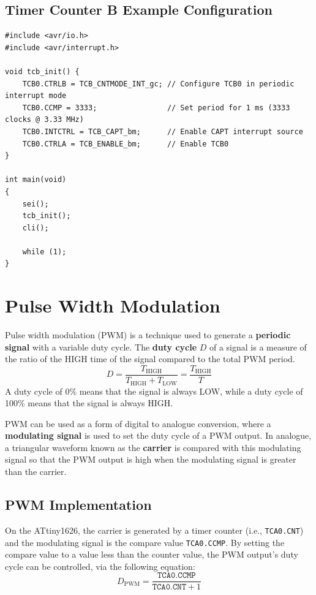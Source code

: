 \documentclass{report}
\begin{document}
\subsection{Timer Counter B Example Configuration}
\begin{verbatim}
#include <avr/io.h>
#include <avr/interrupt.h>

void tcb_init() {
    TCB0.CTRLB = TCB_CNTMODE_INT_gc; // Configure TCB0 in periodic interrupt mode
    TCB0.CCMP = 3333;                // Set period for 1 ms (3333 clocks @ 3.33 MHz)
    TCB0.INTCTRL = TCB_CAPT_bm;      // Enable CAPT interrupt source
    TCB0.CTRLA = TCB_ENABLE_bm;      // Enable TCB0
}

int main(void)
{
    sei();
    tcb_init();
    cli();

    while (1);
}
\end{verbatim}
\section{Pulse Width Modulation}
Pulse width modulation (PWM) is a technique used to generate a \textbf{periodic signal}
with a variable duty cycle. The \textbf{duty cycle} \(D\) of a signal
is a measure of the ratio of the HIGH time of the signal compared to the total PWM period.
\begin{equation*}
    D = \frac{T_\mathrm{HIGH}}{T_\mathrm{HIGH} + T_\mathrm{LOW}} = \frac{T_\mathrm{HIGH}}{T}
\end{equation*}
A duty cycle of 0\% means that the signal is always LOW, while a duty cycle of 100\%
means that the signal is always HIGH\@.

PWM can be used as a form of digital to analogue conversion, where a \textbf{modulating signal}
is used to set the duty cycle of a PWM output. In analogue, a triangular waveform known as the \textbf{carrier}
is compared with this modulating signal so that the PWM output is high when the modulating signal is greater than the carrier.
\subsection{PWM Implementation}
On the ATtiny1626, the carrier is generated by a timer counter (i.e., \texttt{TCA0.CNT}) and the modulating signal
is the compare value \texttt{TCA0.CCMP}. By setting the compare value to a value less than the counter value,
the PWM output's duty cycle can be controlled, via the following equation:
\begin{equation*}
    D_\mathrm{PWM} = \frac{\texttt{TCA0.CCMP}}{\texttt{TCA0.CNT} + 1}
\end{equation*}
\end{document}
